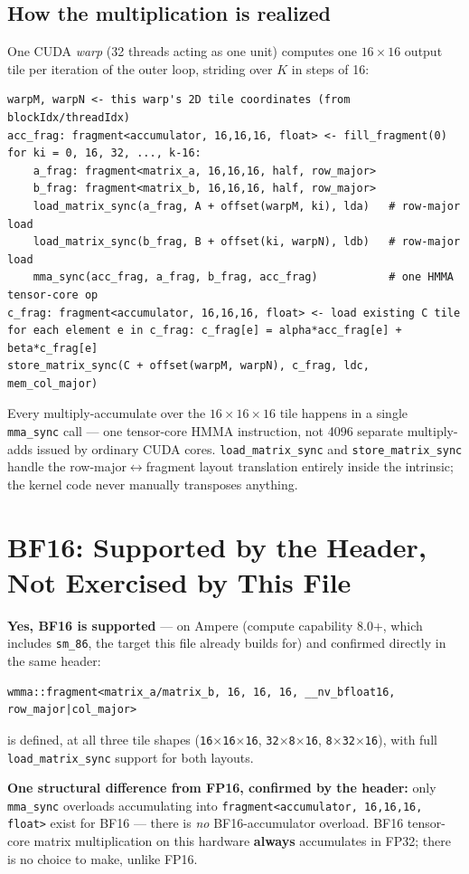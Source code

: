 \documentclass[11pt]{article}
\begin{document}
\subsection{How the multiplication is realized}
One CUDA \emph{warp} (32 threads acting as one unit) computes one $16\times16$ output
tile per iteration of the outer loop, striding over $K$ in steps of 16:
\begin{lstlisting}
warpM, warpN <- this warp's 2D tile coordinates (from blockIdx/threadIdx)
acc_frag: fragment<accumulator, 16,16,16, float> <- fill_fragment(0)
for ki = 0, 16, 32, ..., k-16:
    a_frag: fragment<matrix_a, 16,16,16, half, row_major>
    b_frag: fragment<matrix_b, 16,16,16, half, row_major>
    load_matrix_sync(a_frag, A + offset(warpM, ki), lda)   # row-major load
    load_matrix_sync(b_frag, B + offset(ki, warpN), ldb)   # row-major load
    mma_sync(acc_frag, a_frag, b_frag, acc_frag)           # one HMMA tensor-core op
c_frag: fragment<accumulator, 16,16,16, float> <- load existing C tile
for each element e in c_frag: c_frag[e] = alpha*acc_frag[e] + beta*c_frag[e]
store_matrix_sync(C + offset(warpM, warpN), c_frag, ldc, mem_col_major)
\end{lstlisting}
Every multiply-accumulate over the $16\times16\times16$ tile happens in a single
\texttt{mma\_sync} call --- one tensor-core HMMA instruction, not 4096 separate
multiply-adds issued by ordinary CUDA cores. \texttt{load\_matrix\_sync} and
\texttt{store\_matrix\_sync} handle the row-major$\leftrightarrow$fragment layout
translation entirely inside the intrinsic; the kernel code never manually transposes
anything.

\section{BF16: Supported by the Header, Not Exercised by This File}
\label{sec:bf16}

\textbf{Yes, BF16 is supported} --- on Ampere (compute capability 8.0+, which includes
\texttt{sm\_86}, the target this file already builds for) and confirmed directly in the
same header:
\begin{lstlisting}
wmma::fragment<matrix_a/matrix_b, 16, 16, 16, __nv_bfloat16, row_major|col_major>
\end{lstlisting}
is defined, at all three tile shapes (\texttt{16$\times$16$\times$16},
\texttt{32$\times$8$\times$16}, \texttt{8$\times$32$\times$16}), with full
\texttt{load\_matrix\_sync} support for both layouts.

\textbf{One structural difference from FP16, confirmed by the header:} only
\texttt{mma\_sync} overloads accumulating into \texttt{fragment<accumulator, 16,16,16,
float>} exist for BF16 --- there is \emph{no} BF16-accumulator overload. BF16 tensor-core
matrix multiplication on this hardware \textbf{always} accumulates in FP32; there is no
choice to make, unlike FP16.
\end{document}
